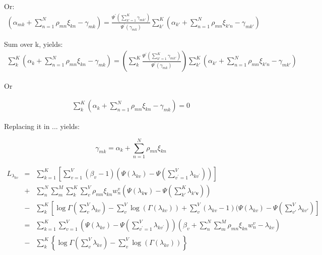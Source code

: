 \documentclass[]{article}
\newcommand{\mparen}[1]{\left(#1\right)}
\begin{document}
Or:
\begin{eqnarray}
(\alpha_{mk} + \sum\limits_{n=1}^{N} \rho_{mn} \xi_{kn} - \gamma_{mk}) = \frac{\Psi^\prime\mparen{\sum\limits_{k'=1}^{K} \gamma_{mk'}}}{\Psi^\prime(\gamma_{mk})} \sum\limits_{k'}^{K} \mparen{\alpha_{k'} + \sum\limits_{n=1}^{N} \rho_{mn} \xi_{k'n} - \gamma_{mk'}}
\end{eqnarray}

Sum over k, yields:
\begin{eqnarray}
\sum_{k}^{K} \mparen{\alpha_{k} + \sum\limits_{n=1}^{N} \rho_{mn} \xi_{kn} - \gamma_{mk}} 
= \mparen{\sum_{k}^{K} \frac{\Psi^\prime\mparen{\sum\limits_{k'=1}^{K} \gamma_{mk'}}}{\Psi^\prime(\gamma_{mk})}} \sum\limits_{k'}^{K} \mparen{\alpha_{k'} + \sum\limits_{n=1}^{N} \rho_{mn} \xi_{k'n} - \gamma_{mk'}}
\end{eqnarray}

Or

\begin{eqnarray}
\sum_{k}^{K} \mparen{\alpha_{k} + \sum\limits_{n=1}^{N} \rho_{mn} \xi_{kn} - \gamma_{mk}} = 0
\end{eqnarray}

Replacing it in ... yields:

\[ \boxed{
\gamma_{mk} = \alpha_{k} + \sum\limits_{n=1}^{N} \rho_{mn} \xi_{kn}
} \]

\begin{eqnarray}
L_{\lambda_{kv}}
&=& \sum\limits_{k=1}^{K} \left\lbrack \sum\limits_{v=1}^{V} (\beta_{v}-1) (\Psi(\lambda_{kv}) - \Psi(\sum\limits_{v^'=1}^{V} \lambda_{kv^'})) \right\rbrack \\
&+& \sum\limits_{n}^{N} \sum\limits_{m}^{M} \sum\limits_{k}^{K} \sum\limits_{v}^{V} \rho_{mn} \xi_{kn} w_n^v (\Psi(\lambda_{k\boldsymbol{v}}) - \Psi(\sum\limits_{k'}^{K} \lambda_{k'\boldsymbol{v}})) \\
&-& \sum\limits_{k}^{K} \left\lbrack \log \Gamma \mparen{\sum\limits_{v}^{V} \lambda_{kv}} - \sum\limits_{v}^{V} \log(\Gamma(\lambda_{kv})) + \sum\limits_{v}^{V}(\lambda_{kv}-1)(\Psi(\lambda_{kv}) - \Psi(\sum\limits_{v'}^{V} \lambda_{kv'}) \right\rbrack \\
&=& \sum\limits_{k=1}^{K} \sum\limits_{v=1}^{V} \mparen{\Psi(\lambda_{kv}) - \Psi(\sum\limits_{v^'=1}^{V} \lambda_{kv^'})} \mparen{\beta_{v} + \sum\limits_{n}^{N} \sum\limits_{m}^{M} \rho_{mn} \xi_{kn} w_n^v - \lambda_{kv}} \\
&-& \sum\limits_{k}^{K} \left\lbrace \log \Gamma(\sum\limits_{v}^{V} \lambda_{kv}) - \sum\limits_{v}^{V} \log(\Gamma(\lambda_{kv})) \right\rbrace
\end{eqnarray}
\end{document}
